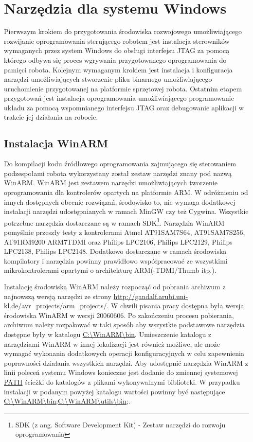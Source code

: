\section{Narzędzia dla systemu Windows}
Pierwszym krokiem do przygotowania środowiska rozwojowego umożliwiającego
rozwijanie oprogramowania sterującego robotem jest instalacja sterowników
wymaganych przez system Windows do obsługi interfejsu JTAG za pomocą którego
odbywa się proces wgrywania przygotowanego oprogramowania do pamięci robota.
Kolejnym wymaganym krokiem jest instalacja i konfiguracja narzędzi
umożliwiających stworzenie pliku binarnego umożliwiającego uruchomienie
przygotowanej na platformie sprzętowej robota. Ostatnim etapem przygotowań jest
instalacja oprogramowania umożliwiającego programowanie układu za pomocą
wspomnianego interfejsu JTAG oraz debugowanie aplikacji w trakcie jej działania
na robocie.

\subsection{Instalacja WinARM}
Do kompilacji kodu źródłowego oprogramowania zajmującego się sterowaniem
podzespołami robota wykorzystany został zestaw narzędzi znany pod nazwą WinARM.
WinARM jest zestawem narzędzi umożliwiających tworzenie oprogramowania dla
kontrolerów opartych na platformie ARM. W odróżnieniu od innych dostępnych
obecnie rozwiązań, środowisko to, nie wymaga dodatkowej instalacji narzędzi
udostępnianych w ramach MinGW czy też Cygwina. Wszystkie potrzebne narzędzia
dostarczane są w ramach SDK\footnote{SDK (z ang. Software Development Kit) -
Zestaw narzędzi do rozwoju oprogramowania}. Narzędzia WinARM pomyślnie przeszły
testy z kontrolerami Atmel AT91SAM7S64, AT91SAM7S256, AT91RM9200 ARM7TDMI oraz
Philips LPC2106, Philips LPC2129, Philips LPC2138, Philips LPC2148. Dodatkowo 
dostarczane w ramach środowiska kompilatory i narzędzia powinny prawidłowo
współpracować ze wszystkimi mikrokontrolerami opartymi o architekturę
ARM(-TDMI/Thumb itp.).

Instalację środowiska WinARM należy rozpocząć od pobrania archiwum z najnowszą wersją narzędzi ze strony
\url{http://gandalf.arubi.uni-kl.de/avr_projects/arm_projects/}. W chwili pisania
pracy dostępna była wersja środowiska WinARM w wersji 20060606. Po zakończeniu
procesu pobierania, archiwum należy rozpakować w taki sposób aby wszystkie
podstawowe narzędzia dostępne były w katalogu \url{C:\WinARM\bin}. Umieszczenie
katalogu z narzędziami WinARM w innej lokalizacji jest również możliwe, ale może
wymagać wykonania dodatkowych operacji konfiguracyjnych w celu zapewnienia
poprawności działania wszystkich narzędzi. Aby udostępnić narzędzia WinARM z
linii poleceń systemu Windows konieczne jest dodanie do zmiennej systemowej
\url{PATH} ścieżki do katalogów z plikami wykonywalnymi biblioteki.
W przypadku instalacji w podanym powyżej katalogu wartości powinny być
następujące \url{C:\WinARM\bin;C:\WinARM\utils\bin;}.

